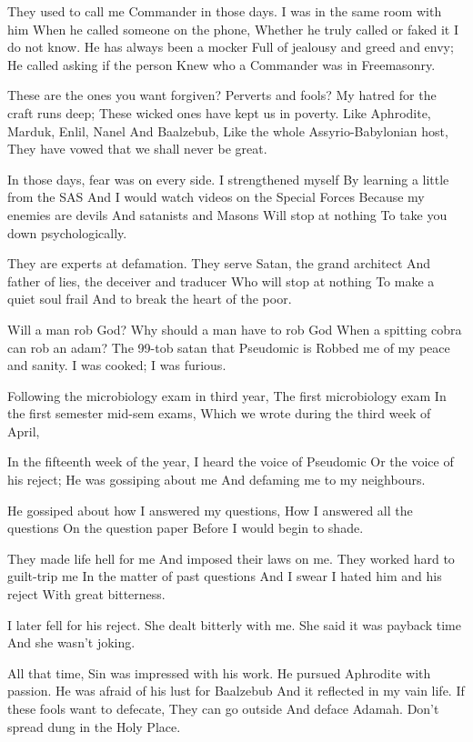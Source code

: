 \documentclass[
]{book}
\begin{document}
They used to call me Commander in those days.
I was in the same room with him
When he called someone on the phone,
Whether he truly called or faked it I do not know.
He has always been a mocker
Full of jealousy and greed and envy;
He called asking if the person
Knew who a Commander was in Freemasonry.

These are the ones you want forgiven?
Perverts and fools?
My hatred for the craft runs deep;
These wicked ones have kept us in poverty.
Like Aphrodite, Marduk, Enlil, Nanel
And Baalzebub,
Like the whole Assyrio-Babylonian host,
They have vowed that we shall never be great.

In those days, fear was on every side.
I strengthened myself
By learning a little from the SAS
And I would watch videos on the Special Forces
Because my enemies are devils
And satanists and Masons
Will stop at nothing
To take you down psychologically.

They are experts at defamation.
They serve Satan, the grand architect
And father of lies, the deceiver and traducer
Who will stop at nothing
To make a quiet soul frail
And to break the heart of the poor.

Will a man rob God?
Why should a man have to rob God
When a spitting cobra can rob an adam?
The 99-tob satan that Pseudomic is
Robbed me of my peace and sanity.
I was cooked; I was furious.

Following the microbiology exam in third year,
The first microbiology exam
In the first semester mid-sem exams,
Which we wrote during the third week of April,

In the fifteenth week of the year,
I heard the voice of Pseudomic
Or the voice of his reject;
He was gossiping about me
And defaming me to my neighbours.

He gossiped about how I answered my questions,
How I answered all the questions
On the question paper
Before I would begin to shade.

They made life hell for me
And imposed their laws on me.
They worked hard to guilt-trip me
In the matter of past questions
And I swear I hated him and his reject
With great bitterness.

I later fell for his reject.
She dealt bitterly with me.
She said it was payback time
And she wasn't joking.

All that time,
Sin was impressed with his work.
He pursued Aphrodite with passion.
He was afraid of his lust for Baalzebub
And it reflected in my vain life.
If these fools want to defecate,
They can go outside
And deface Adamah.
Don't spread dung in the Holy Place.
\end{document}
